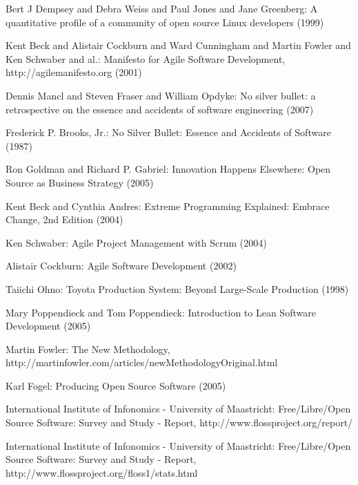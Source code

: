 \documentclass[lnbip]{svmultln}
\begin{document}
\begin{thebibliography}{5}

 Bert J Dempsey and Debra Weiss and Paul
  Jones and Jane Greenberg: A quantitative profile of a community of
  open source Linux developers (1999)

 Kent Beck and Alistair Cockburn and Ward
  Cunningham and Martin Fowler and Ken Schwaber and al.: Manifesto for
  Agile Software Development, http://agilemanifesto.org (2001)

 Dennis Mancl and Steven Fraser and
  William Opdyke: No silver bullet: a retrospective on the essence and
  accidents of software engineering (2007)

 Frederick P. Brooks, Jr.: No Silver Bullet:
  Essence and Accidents of Software (1987)

 Ron Goldman and Richard P. Gabriel: Innovation
  Happens Elsewhere: Open Source as Business Strategy (2005)

 Kent Beck and Cynthia Andres: Extreme Programming
  Explained: Embrace Change, 2nd Edition (2004)

 Ken Schwaber: Agile Project Management with
  Scrum (2004)

 Alistair Cockburn: Agile Software Development
  (2002)

 Taiichi Ohno: Toyota Production System: Beyond
  Large-Scale Production (1998)

 Mary Poppendieck and Tom Poppendieck:
  Introduction to Lean Software Development (2005)

 Martin Fowler: The New Methodology,\\
  http://martinfowler.com/articles/newMethodologyOriginal.html

 Karl Fogel: Producing Open Source Software (2005)

 International Institute of Infonomics -
  University of Maastricht: Free/Libre/Open Source Software: Survey
  and Study - Report, http://www.flossproject.org/report/

 International Institute of Infonomics -
  University of Maastricht: Free/Libre/Open Source Software: Survey
  and Study - Report, http://www.flossproject.org/floss1/stats.html


\end{thebibliography}
\end{document}
